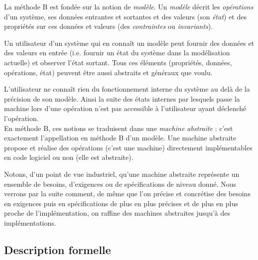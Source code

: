 \documentclass[10pt,a4paper]{article}
\begin{document}
La méthode B est fondée sur la notion de \emph{modèle}. Un \emph{modèle} décrit les \emph{opérations} d'un système, ses données entrantes et sortantes et des valeurs (son \emph{état}) et des propriétés sur ces données et valeurs (des \emph{contraintes} ou \emph{invariants}).

Un utilisateur d'un système qui en connaît un modèle peut fournir des données et des valeurs en entrée (i.e. fournir un état du système dans la modélisation actuelle) et observer l'état sortant. Tous ces  éléments (propriétés, données, opérations, état) peuvent être aussi abstraits et généraux que voulu.

L'utilisateur ne connaît rien du fonctionnement interne du système au delà de la précision de son modèle. Ainsi la suite des états internes par lesquels passe la machine lors d'une opération n'est pas accessible à l'utilisateur ayant déclenché l'opération.
\\

En méthode B, ces notions se traduisent dans une \emph{machine abstraite} : c'est exactement l'appellation en méthode B d'un modèle. Une machine abstraite propose et réalise des opérations (c'est une machine) directement implémentables en code logiciel ou non (elle est abstraite).

Notons, d'un point de vue industriel, qu'une machine abstraite représente un ensemble de besoins, d'exigences ou de spécifications de niveau donné. Nous verrons par la suite comment, de même que l'on précise et concrétise des besoins en exigences puis en spécifications de plus en plus précises et de plus en plus proche de l'implémentation, on raffine des machines abstraites jusqu'à des implémentations.

\subsection{Description formelle}
\end{document}
